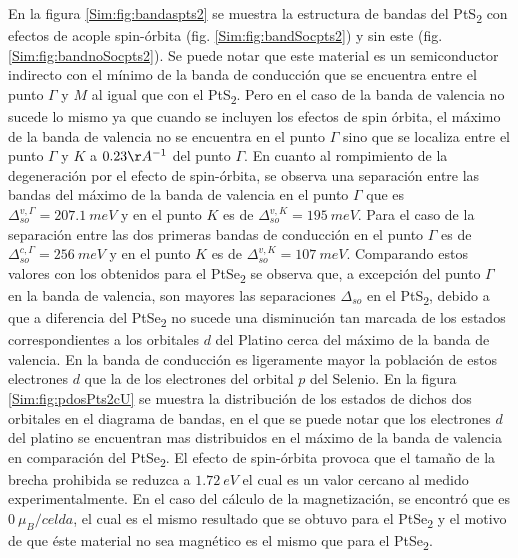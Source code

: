 \par En la figura \ref{Sim:fig:bandaspts2} se muestra la estructura de bandas del PtS\textsubscript{2} con efectos de acople spin-\'orbita (fig. \ref{Sim:fig:bandSocpts2}) y sin este (fig. \ref{Sim:fig:bandnoSocpts2}). Se puede notar que este material es un semiconductor indirecto con el m\'inimo de la banda de conducci\'on que se encuentra entre el punto $\Gamma$ y $M$ al igual que con el PtS\textsubscript{2}. Pero en el caso de la banda de valencia no sucede lo mismo ya que cuando se incluyen los efectos de spin \'orbita, el m\'aximo de la banda de valencia no se encuentra en el punto $\Gamma$ sino que se localiza entre el punto $\Gamma$ y $K$ a $0.23 \AA^{-1}$ del punto $\Gamma$. En cuanto al rompimiento de la degeneraci\'on por el efecto de spin-\'orbita, se observa una separaci\'on entre las bandas del m\'aximo de la banda de valencia en el punto $\Gamma$ que es $\Delta_{so}^{v,\Gamma}= 207.1~ meV$ y en el punto $K$ es de $\Delta_{so}^{v,K}= 195~ meV$. Para el caso de  la separaci\'on entre las dos  primeras bandas de conducci\'on  en el punto $\Gamma$ es de $\Delta_{so}^{c,\Gamma}= 256~ meV$ y en el punto $K$ es de  $\Delta_{so}^{v,K}= 107~ meV$. Comparando estos valores con los obtenidos para el PtSe\textsubscript{2} se observa que, a excepci\'on del punto $\Gamma$ en la banda de valencia,  son mayores las separaciones $\Delta_{so}$ en el PtS\textsubscript{2}, debido  a que a diferencia del PtSe\textsubscript{2} no sucede una disminuci\'on tan marcada de los estados correspondientes a los orbitales $d$ del Platino cerca del m\'aximo de la banda de valencia.  En la banda de conducci\'on es ligeramente  mayor la poblaci\'on de estos electrones $d$ que la de los electrones del orbital $p$ del Selenio. En la figura \ref{Sim:fig:pdosPts2cU} se muestra la distribuci\'on de los estados de dichos dos orbitales en el diagrama de bandas, en el que se puede notar que los electrones $d$ del platino se encuentran mas distribuidos en el m\'aximo de la banda de valencia en comparaci\'on del PtSe\textsubscript{2}. El efecto de spin-\'orbita provoca que el tama\~no de la brecha prohibida se reduzca a $1.72~ eV$ el cual es un valor cercano al medido experimentalmente\cite{https://doi.org/10.1002/adma.201504572}.
\newline
En el caso del c\'alculo de la magnetizaci\'on, se encontr\'o que es $0 ~\mu_{B}/celda$, el cual es el mismo resultado que se obtuvo para el PtSe\textsubscript{2} y el motivo de que \'este material no sea magn\'etico es el mismo que para el PtSe\textsubscript{2}.
